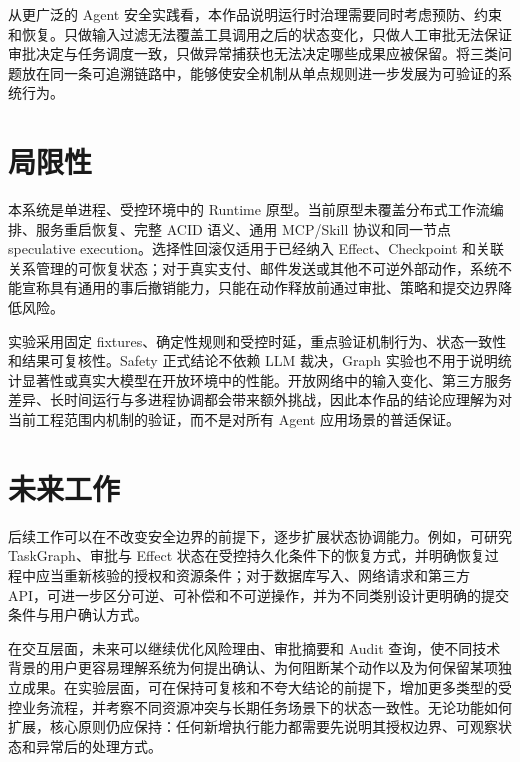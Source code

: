 从更广泛的 Agent 安全实践看，本作品说明运行时治理需要同时考虑预防、约束和恢复。只做输入过滤无法覆盖工具调用之后的状态变化，只做人工审批无法保证审批决定与任务调度一致，只做异常捕获也无法决定哪些成果应被保留。将三类问题放在同一条可追溯链路中，能够使安全机制从单点规则进一步发展为可验证的系统行为。

\section{局限性}

本系统是单进程、受控环境中的 Runtime 原型。当前原型未覆盖分布式工作流编排、服务重启恢复、完整 ACID 语义、通用 MCP/Skill 协议和同一节点 speculative execution。选择性回滚仅适用于已经纳入 Effect、Checkpoint 和关联关系管理的可恢复状态；对于真实支付、邮件发送或其他不可逆外部动作，系统不能宣称具有通用的事后撤销能力，只能在动作释放前通过审批、策略和提交边界降低风险。

实验采用固定 fixtures、确定性规则和受控时延，重点验证机制行为、状态一致性和结果可复核性。Safety 正式结论不依赖 LLM 裁决，Graph 实验也不用于说明统计显著性或真实大模型在开放环境中的性能。开放网络中的输入变化、第三方服务差异、长时间运行与多进程协调都会带来额外挑战，因此本作品的结论应理解为对当前工程范围内机制的验证，而不是对所有 Agent 应用场景的普适保证。

\section{未来工作}

后续工作可以在不改变安全边界的前提下，逐步扩展状态协调能力。例如，可研究 TaskGraph、审批与 Effect 状态在受控持久化条件下的恢复方式，并明确恢复过程中应当重新核验的授权和资源条件；对于数据库写入、网络请求和第三方 API，可进一步区分可逆、可补偿和不可逆操作，并为不同类别设计更明确的提交条件与用户确认方式。

在交互层面，未来可以继续优化风险理由、审批摘要和 Audit 查询，使不同技术背景的用户更容易理解系统为何提出确认、为何阻断某个动作以及为何保留某项独立成果。在实验层面，可在保持可复核和不夸大结论的前提下，增加更多类型的受控业务流程，并考察不同资源冲突与长期任务场景下的状态一致性。无论功能如何扩展，核心原则仍应保持：任何新增执行能力都需要先说明其授权边界、可观察状态和异常后的处理方式。
